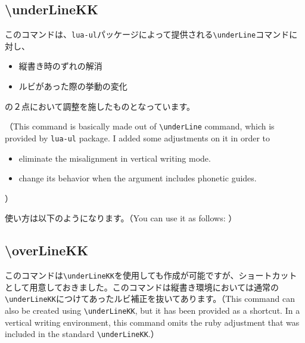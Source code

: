 \documentclass[luatex,fontsize=8pt,paper=b5,twoside]{jlreq}%
\begin{document}
\subsection{\textbackslash underLineKK}
このコマンドは、\texttt{lua-ul}パッケージによって提供される\verb|\underLine|コマンドに対し、

\begin{itemize}
  \item 縦書き時のずれの解消
  \item ルビがあった際の挙動の変化
\end{itemize}

\noindent の２点において調整を施したものとなっています。

（This command is basically made out of \verb|\underLine| command, which is provided by \texttt{lua-ul} package. I added some adjustments on it in order to 
\begin{itemize}
  \item eliminate the misalignment in vertical writing mode.
  \item change its behavior when the argument includes phonetic guides.
\end{itemize}
）

使い方は以下のようになります。（You can use it as follows: ）



\subsection{\textbackslash overLineKK}
このコマンドは\verb|\underLineKK|を使用しても作成が可能ですが、ショートカットとして用意しておきました。このコマンドは縦書き環境においては通常の\verb|\underLineKK|につけてあったルビ補正を抜いてあります。（This command can also be created using \verb|\underLineKK|, but it has been provided as a shortcut. In a vertical writing environment, this command omits the ruby adjustment that was included in the standard \verb|\underLineKK|.）
\end{document}
